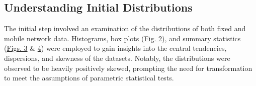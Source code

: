 \documentclass[
  letterpaper,
  DIV=11,
  numbers=noendperiod,
  oneside]{scrartcl}
\begin{document}
\hypertarget{understanding-initial-distributions}{%
\subsection{Understanding Initial
Distributions}\label{understanding-initial-distributions}}

The initial step involved an examination of the distributions of both
fixed and mobile network data. Histograms, box plots
(\protect\hyperlink{fig-distplots}{Fig. 2}), and summary statistics
(\protect\hyperlink{fig-stats}{Figs. 3} \&
\protect\hyperlink{fig-colskews}{4}) were employed to gain insights into
the central tendencies, dispersions, and skewness of the datasets.
Notably, the distributions were observed to be heavily positively
skewed, prompting the need for transformation to meet the assumptions of
parametric statistical tests.
\end{document}
